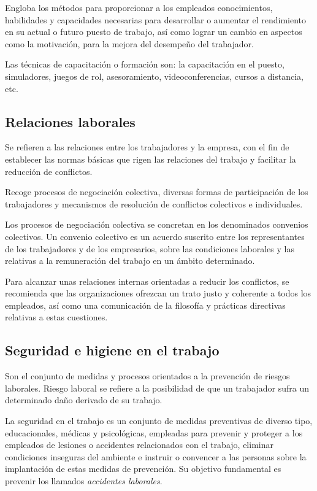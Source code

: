 \documentclass[10pt,a4paper,spanish]{report}
\begin{document}
                        Engloba los métodos para proporcionar a los empleados conocimientos, habilidades y capacidades necesarias para desarrollar o aumentar el rendimiento en su actual o futuro puesto de trabajo, así como lograr un cambio en aspectos como la motivación, para la mejora del desempeño del trabajador.

                        Las técnicas de capacitación o formación son: la capacitación en el puesto, simuladores, juegos de rol, asesoramiento, videoconferencias, cursos a distancia, etc.

            \subsection{\textcolor[rgb]{0.8,0.2,0.8}Relaciones laborales}

                  Se refieren a las relaciones entre los trabajadores y la empresa, con el fin de establecer las normas básicas que rigen las relaciones del trabajo y facilitar la reducción de conflictos.

                  Recoge procesos de negociación colectiva, diversas formas de participación de los trabajadores y mecanismos de resolución de conflictos colectivos e individuales.

                  Los procesos de negociación colectiva se concretan en los denominados convenios colectivos. Un convenio colectivo es un acuerdo suscrito entre los representantes de los trabajadores y de los empresarios, sobre las condiciones laborales y las relativas a la remuneración del trabajo en un ámbito determinado.

                  Para alcanzar unas relaciones internas orientadas a reducir los conflictos, se recomienda que las organizaciones ofrezcan un trato justo y coherente a todos los empleados, así como una comunicación de la filosofía y prácticas directivas relativas a estas cuestiones.

            \subsection{\textcolor[rgb]{0.8,0.2,0.8}Seguridad e higiene en el trabajo}

                  Son el conjunto de medidas y procesos orientados a la prevención de riesgos laborales. Riesgo laboral se refiere a la posibilidad de que un trabajador sufra un determinado daño derivado de su trabajo.

                  La seguridad en el trabajo es un conjunto de medidas preventivas de diverso tipo, educacionales, médicas y psicológicas, empleadas para prevenir y proteger a los empleados de lesiones o accidentes relacionados con el trabajo, eliminar condiciones inseguras del ambiente e instruir o convencer a las personas sobre la implantación de estas medidas de prevención. Su objetivo fundamental es prevenir los llamados \textit{\textcolor[rgb]{0.8,0.2,0.8}{accidentes laborales}}.
\end{document}
